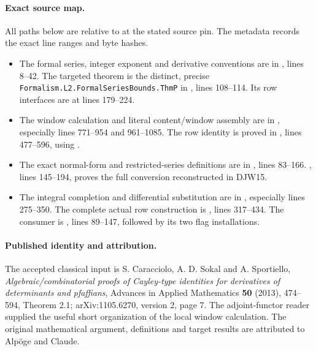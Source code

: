 \paragraph{Exact source map.}
All paths below are relative to  at the stated source
pin.  The metadata records the exact line ranges and byte hashes.
\begin{itemize}
\item The formal series, integer exponent and derivative conventions
are in
, lines 8--42.
The targeted theorem is the distinct, precise
\nolinkurl{Formalism.L2.FormalSeriesBounds.ThmP} in
, lines 108--114.
Its row interfaces are at lines 179--224.
\item The window calculation and literal content/window assembly are
in 
, especially lines 771--954 and
961--1085.  The row identity is proved in
, lines 477--596, using
.
\item The exact normal-form and restricted-series definitions are in
, lines 83--166.
, lines 145--194, proves
the full conversion reconstructed in DJW15.
\item The integral completion and differential substitution are in
, especially lines 275--350.
The complete actual row construction is
, lines 317--434.
The consumer is ,
lines 89--147, followed by its two flag installations.
\end{itemize}

\paragraph{Published identity and attribution.}
The accepted classical input is S. Caracciolo, A. D. Sokal and
A. Sportiello, \emph{Algebraic/combinatorial proofs of Cayley-type
identities for derivatives of determinants and pfaffians},
Advances in Applied Mathematics \textbf{50} (2013), 474--594,
Theorem 2.1; arXiv:1105.6270, version 2, page 7.
The adjoint-functor reader supplied the useful short organization of
the local window calculation.  The original mathematical argument,
definitions and target results are attributed to Alp\"oge and Claude.
